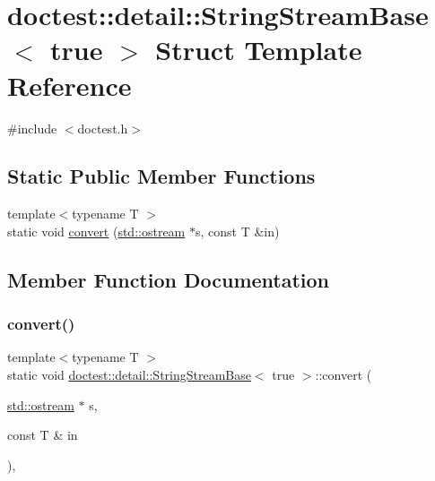 \hypertarget{structdoctest_1_1detail_1_1_string_stream_base_3_01true_01_4}{}\section{doctest\+:\+:detail\+:\+:String\+Stream\+Base$<$ true $>$ Struct Template Reference}
\label{structdoctest_1_1detail_1_1_string_stream_base_3_01true_01_4}


{\ttfamily \#include $<$doctest.\+h$>$}

\subsection*{Static Public Member Functions}
\begin{DoxyCompactItemize}
\item 
{\footnotesize template$<$typename T $>$ }\\static void \hyperlink{structdoctest_1_1detail_1_1_string_stream_base_3_01true_01_4_a3f86285d254474498065e6b70522e2b7}{convert} (\hyperlink{doctest_8h_a116af65cb5e924b33ad9d9ecd7a783f3}{std\+::ostream} $\ast$s, const T \&in)
\end{DoxyCompactItemize}


\subsection{Member Function Documentation}
\mbox{\label{structdoctest_1_1detail_1_1_string_stream_base_3_01true_01_4_a3f86285d254474498065e6b70522e2b7}} 
\subsubsection{\texorpdfstring{convert()}{convert()}}
{\footnotesize\ttfamily template$<$typename T $>$ \\
static void \hyperlink{structdoctest_1_1detail_1_1_string_stream_base}{doctest\+::detail\+::\+String\+Stream\+Base}$<$ true $>$\+::convert (\begin{DoxyParamCaption}\item[{\hyperlink{doctest_8h_a116af65cb5e924b33ad9d9ecd7a783f3}{std\+::ostream} $\ast$}]{s,  }\item[{const T \&}]{in }\end{DoxyParamCaption})\hspace{0.3cm}{\ttfamily [inline]}, {\ttfamily [static]}}

